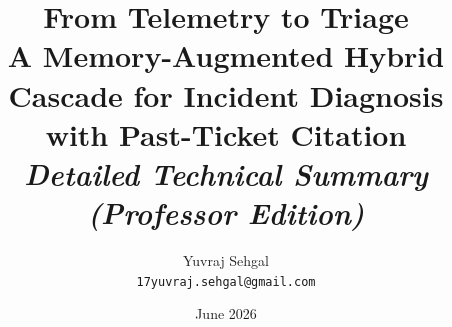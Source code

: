 \documentclass[11pt,a4paper]{article}
\title{
  \Large\textbf{From Telemetry to Triage}\\[2pt]
  \large A Memory-Augmented Hybrid Cascade for Incident Diagnosis with Past-Ticket Citation\\[6pt]
  \normalsize\textit{Detailed Technical Summary (Professor Edition)}
}
\author{Yuvraj Sehgal\\\small\texttt{17yuvraj.sehgal@gmail.com}}
\date{June 2026}
\begin{document}
\maketitle

\begin{abstract}

\end{abstract}

\tableofcontents
\vspace{1em}












\end{document}
